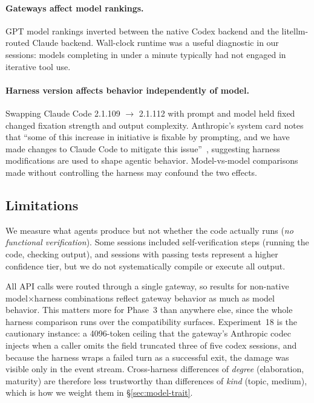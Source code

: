 \documentclass{article}
\begin{document}
\paragraph{Gateways affect model rankings.} GPT model rankings
inverted between the native Codex backend and the
litellm-routed Claude backend. Wall-clock runtime was a useful
diagnostic in our sessions: models completing in under a
minute typically had not engaged in iterative tool use.

\paragraph{Harness version affects behavior independently of
model.} Swapping Claude Code 2.1.109 $\to$ 2.1.112 with prompt
and model held fixed changed fixation strength and output
complexity. Anthropic's system card notes that ``some of this
increase in initiative is fixable by prompting, and we have
made changes to Claude Code to mitigate this
issue''~\citep{anthropic2026opus46card}, suggesting harness
modifications are used to shape agentic behavior.
Model-vs-model comparisons made without controlling the
harness may confound the two effects.

\subsection{Limitations}
\label{sec:limitations}

We measure what agents produce but not whether the code actually
runs (\emph{no functional verification}). Some sessions included
self-verification steps (running the code, checking output), and
sessions with passing tests represent a higher confidence tier,
but we do not systematically compile or execute all output.

All API calls were routed through a single gateway, so results for
non-native model$\times$harness combinations reflect gateway
behavior as much as model behavior. This matters more for
Phase~3 than anywhere else, since the whole harness comparison
runs over the compatibility surfaces. Experiment~18 is the
cautionary instance: a 4096-token ceiling that the gateway's
Anthropic codec injects when a caller omits the field truncated
three of five codex sessions, and because the harness wraps a
failed turn as a successful exit, the damage was visible only in
the event stream. Cross-harness differences of \emph{degree}
(elaboration, maturity) are therefore less trustworthy than
differences of \emph{kind} (topic, medium), which is how we weight
them in \S\ref{sec:model-trait}.
\end{document}
